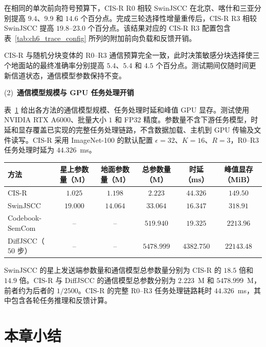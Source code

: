 在相同的单次前向符号预算下，CIS-R R0 相较 SwinJSCC 在北京、喀什和三亚分别提高 $9.4$、$9.9$ 和 $14.6$ 个百分点。完成三轮选择性增量重传后，CIS-R R3 相较 SwinJSCC 提高 $19.8$--$23.0$ 个百分点。该结果对应的 CIS-R R3 配置包含表~\ref{tab:ch6_trace_config} 所列的附加前向负载和反馈开销。

CIS-R 与随机分块变体的 R0--R3 通信预算完全一致，此时决策敏感分块选择使三个地面站的最终准确率分别提高 $5.4$、$5.4$ 和 $4.5$ 个百分点。测试期间仅随时间更新信道状态，通信模型参数保持不变。

\noindent(2)~\textbf{通信模型规模与 GPU 任务处理开销}

表~\ref{tab:ch6_complexity_latency} 给出各方法的通信模型规模、任务处理时延和峰值 GPU 显存。测试使用 NVIDIA RTX A6000、批量大小 $1$ 和 FP32 精度。参数量不含下游任务模型，时延和显存覆盖已实现的完整任务处理链路，不含数据加载、主机到 GPU 传输及文件读写。CIS-R 采用 ImageNet-100 的默认配置 $\epsilon=32$、$K=16$、$R=3$，R0--R3 任务处理时延为 $44.326$~ms。

\begin{table}[!htp]
    \centering
    \label{tab:ch6_complexity_latency}
    \footnotesize
    \renewcommand{\arraystretch}{1.12}
    \setlength{\tabcolsep}{4pt}
    \begin{tabular}{@{}lccccc@{}}
        \toprule
        方法 & 星上参数量（M） & 地面参数量（M） & 总参数量（M） & 时延（ms） & 峰值显存（MiB） \\
        \midrule
        CIS-R & $1.025$ & $1.198$ & $2.223$ & $44.326$ & $149.50$ \\
        SwinJSCC & $19.000$ & $14.064$ & $33.064$ & $16.347$ & $318.91$ \\
        Codebook-SemCom & -- & -- & $519.940$ & $19.325$ & $2213.96$ \\
        DiffJSCC（$50$ 步） & -- & -- & $5478.999$ & $4382.750$ & $22143.48$ \\
        \bottomrule
    \end{tabular}
\end{table}

SwinJSCC 的星上发送端参数量和通信模型总参数量分别为 CIS-R 的 $18.5$ 倍和 $14.9$ 倍。CIS-R 与 DiffJSCC 的通信模型总参数分别为 $2.223$~M 和 $5478.999$~M，前者约为后者的 $1/2500$。CIS-R 的完整 R0--R3 任务处理链路耗时 $44.326$~ms，其中包含各轮任务推理和反馈计算。

\section{本章小结}

